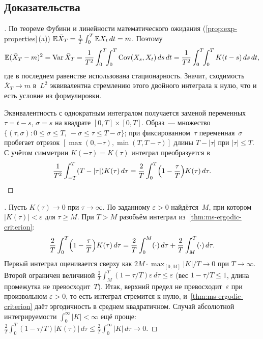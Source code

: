 \subsection*{Доказательства}

\begin{proof}[]
По теореме Фубини и линейности математического ожидания (\cref{prop:exp-properties}\,(a)) $\mathbb{E} \bar X_T = \frac{1}{T} \int_0^T \mathbb{E} X_t\, dt = m$. Поэтому
\[
  \mathbb{E} (\bar X_T - m)^2 = \operatorname{Var} \bar X_T = \frac{1}{T^2} \int_0^T \!\!\int_0^T \operatorname{Cov}(X_s, X_t)\, ds\, dt = \frac{1}{T^2} \int_0^T \!\!\int_0^T K(t - s)\, ds\, dt,
\]
где в последнем равенстве использована стационарность. Значит, сходимость $\bar X_T \to m$ в~$L^2$ эквивалентна стремлению этого двойного интеграла к нулю, что и есть условие из формулировки.

Эквивалентность с однократным интегралом получается заменой переменных $\tau = t - s$, $\sigma = s$ на квадрате $[0, T] \times [0, T]$. Образ~--- множество $\{(\tau, \sigma) : 0 \leq \sigma \leq T,\ -\sigma \leq \tau \leq T - \sigma\}$; при фиксированном~$\tau$ переменная~$\sigma$ пробегает отрезок $[\max(0, -\tau), \min(T, T - \tau)]$ длины $T - |\tau|$ при $|\tau| \leq T$. С учётом симметрии $K(-\tau) = K(\tau)$ интеграл преобразуется в
\[
  \frac{1}{T^2} \int_{-T}^{T} (T - |\tau|) K(\tau)\, d\tau = \frac{2}{T} \int_0^T \Bigl(1 - \frac{\tau}{T}\Bigr) K(\tau)\, d\tau. \qedhere
\]
\end{proof}

\begin{proof}[]
Пусть $K(\tau) \to 0$ при $\tau \to \infty$. По заданному $\varepsilon > 0$ найдётся~$M$, при котором $|K(\tau)| < \varepsilon$ для $\tau \geq M$. При $T > M$ разобьём интеграл из~\cref{thm:ms-ergodic-criterion}:
\[
  \frac{2}{T} \int_0^T \Bigl(1 - \frac{\tau}{T}\Bigr) K(\tau)\, d\tau = \frac{2}{T} \int_0^M (\cdot)\, d\tau + \frac{2}{T} \int_M^T (\cdot)\, d\tau.
\]
Первый интеграл оценивается сверху как $2M \cdot \max_{[0, M]} |K|/T \to 0$ при $T \to \infty$. Второй ограничен величиной $\frac{2}{T} \int_M^T (1 - \tau/T) \varepsilon\, d\tau \leq \varepsilon$ (вес $1 - \tau/T \leq 1$, длина промежутка не превосходит~$T$). Итак, верхний предел не превосходит~$\varepsilon$ при произвольном $\varepsilon > 0$, то есть интеграл стремится к нулю, и~\cref{thm:ms-ergodic-criterion} даёт эргодичность в среднем квадратичном. Случай абсолютной интегрируемости $\int_0^{\infty} |K| < \infty$ ещё проще: $\frac{2}{T} \int_0^T (1 - \tau/T) |K(\tau)|\, d\tau \leq \frac{2}{T} \int_0^{\infty} |K|\, d\tau \to 0$.
\end{proof}

